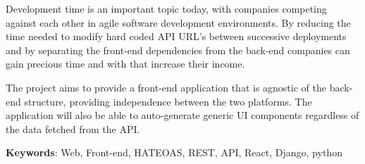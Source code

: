 
Development time is an important topic today, with companies competing against each other in agile software development environments. By reducing the time needed to modify hard coded API URL's between successive deployments and by separating the front-end dependencies from the back-end companies can gain precious time and with that increase their income.

The project aims to provide a front-end application that is agnostic of the back-end structure, providing independence between the two platforms. The application will also be able to auto-generate generic UI components regardless of the data fetched from the API.

\textbf{Keywords}: Web, Front-end, HATEOAS, REST, API, React, Django, python